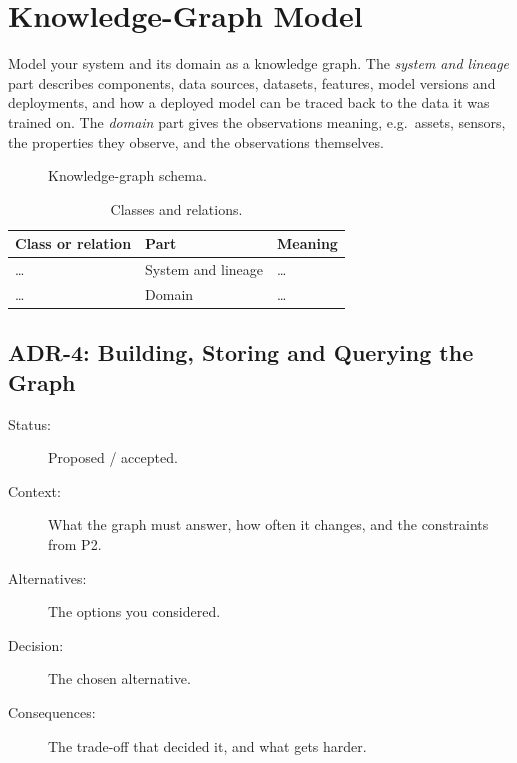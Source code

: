 \documentclass[report]{itvest}
\begin{document}
\section{Knowledge-Graph Model}

Model your system and its domain as a knowledge graph. The
\emph{system and lineage} part describes components, data sources,
datasets, features, model versions and deployments, and how a deployed
model can be traced back to the data it was trained on. The \emph{domain}
part gives the observations meaning, e.g.\ assets, sensors, the properties
they observe, and the observations themselves.

\begin{figure}[h]
  \centering
  \caption{Knowledge-graph schema.}
  \label{fig:schema}
\end{figure}

\begin{table}[h]
  \centering
  \begin{tabularx}{\textwidth}{llX}
    \toprule
    Class or relation & Part & Meaning \\
    \midrule
    \ldots & System and lineage & \ldots \\
    \ldots & Domain & \ldots \\
    \bottomrule
  \end{tabularx}
  \caption{Classes and relations.}
  \label{tab:schema}
\end{table}

\subsection{ADR-4: Building, Storing and Querying the Graph}

\begin{description}
  \item[Status:] Proposed / accepted.
  \item[Context:] What the graph must answer, how often it changes, and the
    constraints from P2.
  \item[Alternatives:] The options you considered.
  \item[Decision:] The chosen alternative.
  \item[Consequences:] The trade-off that decided it, and what gets harder.
\end{description}
\end{document}
